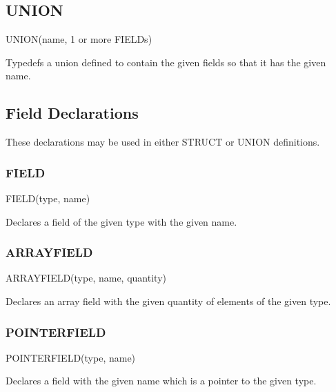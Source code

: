 \documentclass[english]{article}
\begin{document}
\subsection{UNION}

UNION(name, 1 or more FIELDs)

Typedefs a union defined to contain the given fields so that it has
the given name.


\subsection{Field Declarations}

These declarations may be used in either STRUCT or UNION definitions.


\subsubsection{FIELD}

FIELD(type, name)

Declares a field of the given type with the given name.


\subsubsection{ARRAYFIELD}

ARRAYFIELD(type, name, quantity)

Declares an array field with the given quantity of elements of the
given type.


\subsubsection{POINTERFIELD}

POINTERFIELD(type, name)

Declares a field with the given name which is a pointer to the given
type.
\end{document}
